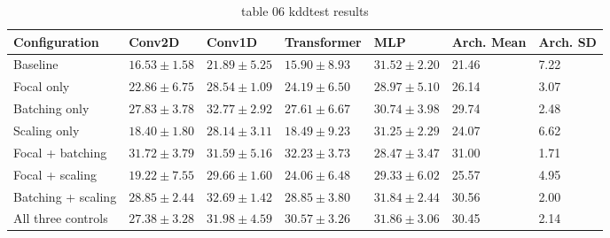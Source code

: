 \begin{table}[t]
\centering
\caption{table 06 kddtest results}
\label{tab:test_results}
\begin{tabular}{lllllll}
\hline
Configuration & Conv2D & Conv1D & Transformer & MLP & Arch. Mean & Arch. SD \\
\hline
Baseline & $16.53\pm1.58$ & $21.89\pm5.25$ & $15.90\pm8.93$ & $31.52\pm2.20$ & 21.46 & 7.22 \\
Focal only & $22.86\pm6.75$ & $28.54\pm1.09$ & $24.19\pm6.50$ & $28.97\pm5.10$ & 26.14 & 3.07 \\
Batching only & $27.83\pm3.78$ & $32.77\pm2.92$ & $27.61\pm6.67$ & $30.74\pm3.98$ & 29.74 & 2.48 \\
Scaling only & $18.40\pm1.80$ & $28.14\pm3.11$ & $18.49\pm9.23$ & $31.25\pm2.29$ & 24.07 & 6.62 \\
Focal + batching & $31.72\pm3.79$ & $31.59\pm5.16$ & $32.23\pm3.73$ & $28.47\pm3.47$ & 31.00 & 1.71 \\
Focal + scaling & $19.22\pm7.55$ & $29.66\pm1.60$ & $24.06\pm6.48$ & $29.33\pm6.02$ & 25.57 & 4.95 \\
Batching + scaling & $28.85\pm2.44$ & $32.69\pm1.42$ & $28.85\pm3.80$ & $31.84\pm2.44$ & 30.56 & 2.00 \\
All three controls & $27.38\pm3.28$ & $31.98\pm4.59$ & $30.57\pm3.26$ & $31.86\pm3.06$ & 30.45 & 2.14 \\
\hline
\end{tabular}
\end{table}
